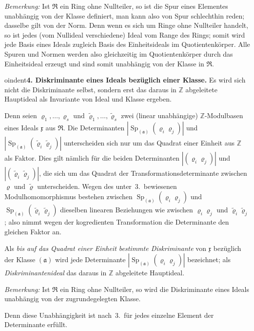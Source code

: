 \documentclass[12pt,a4paper]{article}
\newcommand{\mf}[1]{\mathfrak{#1}}     %
\newcommand{\ideala}{\mathfrak{a}}
\newcommand{\idealx}{\mathfrak{x}}
\newcommand{\ZZ}{\mathbb{Z}}            %
\DeclareMathOperator{\Sp}{Sp}           %
\theoremstyle{definition}
\begin{document}
\textit{Bemerkung:} Ist $\mf{R}$ ein Ring ohne Nullteiler, so ist die Spur eines
Elementes unabh\"angig von der Klasse definiert, man kann also von Spur
schlechthin reden; dasselbe gilt von der Norm. Denn wenn es sich um Ringe
ohne Nullteiler handelt, so ist jedes (vom Nullideal verschiedene) Ideal vom
Range des Rings; somit wird jede Basis eines Ideals zugleich Basis des
Einheitsideals im Quotientenk\"orper. Alle Spuren und Normen werden also
gleichzeitig im Quotientenk\"orper durch das Einheitsideal erzeugt und sind
somit unabh\"angig von der Klasse in $\mf{R}$.

\medskip



oindent\textbf{4. Diskriminante eines Ideals bez\"uglich einer Klasse.} Es
wird sich nicht die Diskriminante selbst, sondern erst das daraus in $\ZZ$
abgeleitete Hauptideal als Invariante von Ideal und Klasse ergeben.

Denn seien $\varrho_1,\dots,\varrho_s$ und $\tilde{\varrho}_1,\dots,\tilde{\varrho}_s$
zwei (linear unabh\"angige) $\ZZ$-Modulbasen eines Ideals $\idealx$ aus
$\mf{R}$. Die Determinanten $|\Sp_{(\ideala)}(\varrho_i\varrho_j)|$ und
$|\Sp_{(\ideala)}(\tilde{\varrho}_i\tilde{\varrho}_j)|$ unterscheiden sich nur
um das Quadrat einer Einheit aus $\ZZ$ als Faktor. Dies gilt n\"amlich f\"ur
die beiden Determinanten $|(\varrho_i\varrho_j)|$ und
$|(\tilde{\varrho}_i\tilde{\varrho}_j)|$, die sich um das Quadrat der
Transformationsdeterminante zwischen $\varrho$ und $\tilde{\varrho}$
unterscheiden. Wegen des unter~3.\ bewiesenen Modulhomomorphismus
bestehen zwischen $\Sp_{(\ideala)}(\varrho_i\varrho_j)$ und
$\Sp_{(\ideala)}(\tilde{\varrho}_i\tilde{\varrho}_j)$ dieselben linearen
Beziehungen wie zwischen $\varrho_i\varrho_j$ und
$\tilde{\varrho}_i\tilde{\varrho}_j$; also nimmt wegen der kogredienten
Transformation die Determinante den gleichen Faktor an.

Als \textit{bis auf das Quadrat einer Einheit bestimmte Diskriminante} von
$\idealx$ bez\"uglich der Klasse $(\ideala)$ wird jede Determinante
$|\Sp_{(\ideala)}(\varrho_i\varrho_j)|$ bezeichnet; als
\textit{Diskriminantenideal} das daraus in $\ZZ$ abgeleitete Hauptideal.

\textit{Bemerkung:} Ist $\mf{R}$ ein Ring ohne Nullteiler, so wird die
Diskriminante eines Ideals unabh\"angig von der zugrundegelegten Klasse.

Denn diese Unabh\"angigkeit ist nach~3.\ f\"ur jedes einzelne Element der
Determinante erf\"ullt.
\end{document}
